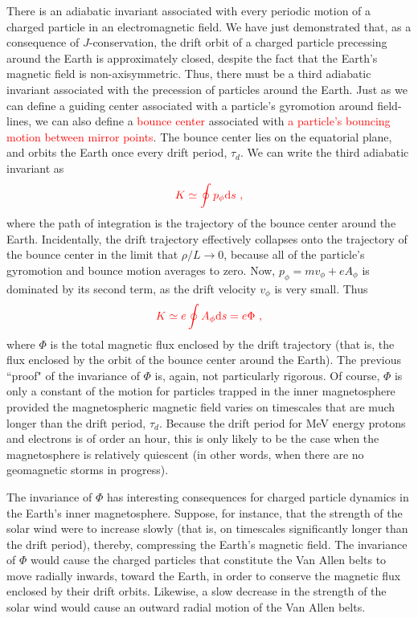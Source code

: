 \documentclass[12pt,a4paper]{article}
\newcommand{\dif}{\mathrm{d}}
\begin{document}
\cite{Plasma2014} There is an adiabatic invariant associated with every periodic motion of a charged particle in an electromagnetic field. We have just demonstrated that, as a consequence of $J$-conservation, the drift orbit of a charged particle precessing around the Earth is approximately closed, despite the fact that the Earth's magnetic field is non-axisymmetric. Thus, there must be a third adiabatic invariant associated with the precession of particles around the Earth. Just as we can define a guiding center associated with a particle’s gyromotion around field-lines, we can also define a \textcolor{red}{bounce center} associated with \textcolor{red}{a particle's bouncing motion between mirror points}. The bounce center lies on the equatorial plane, and orbits the Earth once every drift period, $\tau_d$. We can write the third adiabatic invariant as
\begin{equation}
\color{red} K \simeq \oint p_\phi \dif s ~,
\end{equation}
where the path of integration is the trajectory of the bounce center around the Earth. Incidentally, the drift trajectory effectively collapses onto the trajectory of the bounce center in the limit that $\rho/L \rightarrow 0$, because all of the particle's gyromotion and bounce
motion averages to zero. Now, $p_\phi = m v_\phi + e A_\phi$ is dominated by its second term, as the drift velocity $v_\phi$ is very small. Thus
\begin{equation}
\color{red} K \simeq e \oint A_\phi \dif s = e \Phi ~,
\end{equation}
where $\Phi$ is the total magnetic flux enclosed by the drift trajectory (that is, the flux enclosed by the orbit of the bounce center around the Earth). The previous ``proof" of the invariance of $\Phi$ is, again, not particularly rigorous.  Of course, $\Phi$ is only a constant of the motion for particles trapped in the inner magnetosphere provided the magnetospheric magnetic field varies on timescales that are much longer than the drift period, $\tau_d$. Because the drift period for MeV energy protons and electrons is of order an hour, this is only likely to be the case when the magnetosphere is relatively quiescent (in other words, when there are no geomagnetic storms in progress).

The invariance of $\Phi$ has interesting consequences for charged particle dynamics in the Earth's inner magnetosphere. Suppose, for instance, that the strength of the solar wind were to increase slowly (that is, on timescales significantly longer than the drift period), thereby, compressing the Earth's magnetic field. The invariance of $\Phi$ would cause the charged particles that constitute the Van Allen belts to move radially inwards, toward the Earth, in order to conserve the magnetic flux enclosed by their drift orbits. Likewise, a slow decrease in the strength of the solar wind would cause an outward radial motion of the Van Allen belts.
\end{document}
